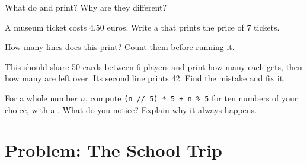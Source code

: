 \begin{exercise}[$\star\star$]\label{exo:g6:first-python-program:8}
What do  and  print? Why are they
different?
\end{exercise}

\begin{exercise}[$\star\star$]\label{exo:g6:first-python-program:9}
A museum ticket costs 4.50 euros. Write a  that prints the price of 7
tickets.
\end{exercise}

\begin{exercise}[$\star\star\star$]\label{exo:g6:first-python-program:10}
How many lines does this  print? Count them before running it.

\label{lst:g6:first-python-program:count-lines}
\end{exercise}

\begin{exercise}[$\star\star\star$]\label{exo:g6:first-python-program:11}
This  should share 50 cards between 6 players and print how many each
gets, then how many are left over. Its second line prints 42. Find the mistake
and fix it.

\label{lst:g6:first-python-program:cards-bug}
\end{exercise}

\begin{exercise}[$\star\star\star$]\label{exo:g6:first-python-program:12}
For a whole number $n$, compute \texttt{(n // 5) * 5 + n \% 5} for ten numbers of
your choice, with a . What do you notice? Explain why it always
happens.
\end{exercise}

\section{Problem: The School Trip}

